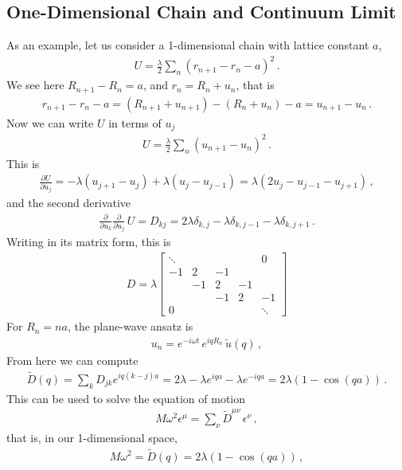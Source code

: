 \documentclass[11pt, oneside]{book}
\theoremstyle{break}
\theoremstyle{break}
\newcommand{\pd}{\partial}
\newcommand{\that}[1]{\widetilde{#1}}
\newcommand{\bmat}[1]{\begin{bmatrix} #1 \end{bmatrix}}
\begin{document}
\subsection{One-Dimensional Chain and Continuum Limit}
As an example, let us consider a 1-dimensional chain with lattice constant $a$,
\begin{align*}
U = \frac{\lambda}{2} \sum_n (r_{n+1} - r_n - a)^2\,.
\end{align*}
We see here $R_{n+1} - R_n = a$, and $r_n = R_n + u_n$, that is 
\begin{align*}
r_{n+1} - r_n - a = (R_{n+1} + u_{n+1}) - (R_n + u_n) -a =u_{n+1} - u_n\,.
\end{align*}
Now we can write $U$ in terms of $u_j$
\begin{align*}
U = \frac{\lambda}{2} \sum_n  (u_{n+1} - u_n)^2\,.
\end{align*}
This is 
\begin{align*}
\frac{\pd U}{\pd u_j} = -\lambda (u_{j+1} - u_j) + \lambda (u_j - u_{j-1}) = \lambda (2u_j - u_{j-1} - u_{j+1})\,,
\end{align*}
and the second derivative
\begin{align*}
\frac{\pd}{\pd u_k}\frac{\pd}{\pd u_j}\, U = D_{kj} = 2\lambda \delta_{k,j} - \lambda \delta_{k, j-1} - \lambda \delta_{k,j+1}\,.
\end{align*}
Writing in its matrix form, this is 
\begin{align*}
D = \lambda \bmat{
\ddots & & & &  0\\
 -1 & 2 & -1 & &  \\
 & -1 & 2 & -1 &  \\
 & & -1 & 2 & -1 \\
0 & & & & \ddots
}
\end{align*}
For $R_n=na$, the plane-wave ansatz is
\begin{align*}
u_n = e^{-i\omega t} \, e^{iqR_n}\, \that{u}(q)\,,
\end{align*}
From here we can compute 
\begin{align*}
\that{D}(q) = \sum_k D_{jk}e^{iq(k-j)a} = 2\lambda - \lambda e^{iqa} - \lambda e^{-iqa} = 2\lambda (1 - \cos(qa))\,.
\end{align*}
This can be used to solve the equation of motion
\begin{align*}
M\omega^2 \epsilon^{\mu}  = \sum_{\nu}\that{D}^{\mu\nu} \, \epsilon^{\nu}\,,
\end{align*}
that is, in our 1-dimensional space, 
\begin{align*}
M\omega^2 = \that{D}(q) = 2\lambda(1-\cos(qa))\,,
\end{align*}
\end{document}
